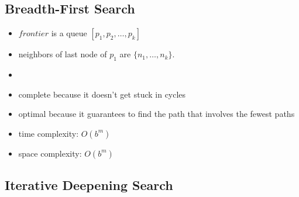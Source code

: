 \documentclass{article}
\begin{document}
\subsection{Breadth-First Search}

\begin{itemize}
    \item $frontier$ is a queue $[p_1, p_2, \ldots, p_k]$
    \item neighbors of last node of $p_1$ are $\{n_1, \ldots, n_k\}$.
    \item
    \begin{algorithmic}
            \EndIf
        \EndWhile
    \end{algorithmic}
    \item complete because it doesn't get stuck in cycles
    \item optimal because it guarantees to find the path that involves the fewest paths
    \item time complexity: $O(b^m)$
    \item space complexity: $O(b^m)$
\end{itemize}

\subsection{Iterative Deepening Search}
\end{document}
